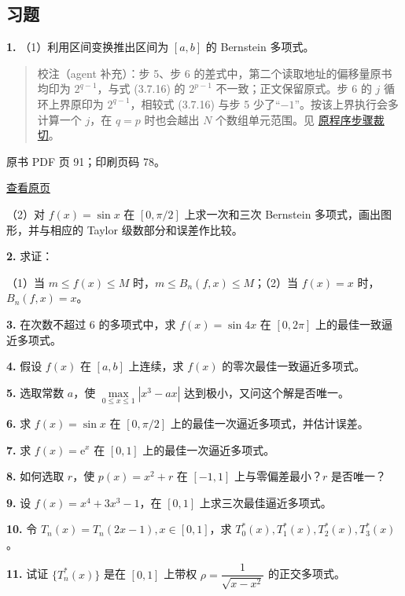 \subsection{习题}\label{ch03b-ux4e60ux9898}

\textbf{1.} （1）利用区间变换推出区间为 \([a,b]\) 的 Bernstein 多项式。

\begin{quote}
校注（agent 补充）：步 5、步 6 的差式中，第二个读取地址的偏移量原书均印为 \(2^{q-1}\)，与式 (3.7.16) 的 \(2^{p-1}\) 不一致；正文保留原式。步 6 的 \(j\) 循环上界原印为 \(2^{q-1}\)，相较式 (3.7.16) 与步 5 少了``\(-1\)''。按该上界执行会多计算一个 \(j\)，在 \(q=p\) 时也会越出 \(N\) 个数组单元范围。见 \href{verified/assets/ch03b/p090-fft-steps.png}{原程序步骤裁切}。
\end{quote}

\clearpage

原书 PDF 页 91；印刷页码 78。

\href{source-images/pdf-091.jpeg}{查看原页}

（2）对 \(f(x)=\sin x\) 在 \([0,\pi/2]\) 上求一次和三次 Bernstein 多项式，画出图形，并与相应的 Taylor 级数部分和误差作比较。

\textbf{2.} 求证：

（1）当 \(m\leqslant f(x)\leqslant M\) 时，\(m\leqslant B_n(f,x)\leqslant M\)；（2）当 \(f(x)=x\) 时，\(B_n(f,x)=x\)。

\textbf{3.} 在次数不超过 \(6\) 的多项式中，求 \(f(x)=\sin4x\) 在 \([0,2\pi]\) 上的最佳一致逼近多项式。

\textbf{4.} 假设 \(f(x)\) 在 \([a,b]\) 上连续，求 \(f(x)\) 的零次最佳一致逼近多项式。

\textbf{5.} 选取常数 \(a\)，使 \(\max\limits_{0\leqslant x\leqslant1}|x^3-ax|\) 达到极小，又问这个解是否唯一。

\textbf{6.} 求 \(f(x)=\sin x\) 在 \([0,\pi/2]\) 上的最佳一次逼近多项式，并估计误差。

\textbf{7.} 求 \(f(x)=\mathrm e^x\) 在 \([0,1]\) 上的最佳一次逼近多项式。

\textbf{8.} 如何选取 \(r\)，使 \(p(x)=x^2+r\) 在 \([-1,1]\) 上与零偏差最小？\(r\) 是否唯一？

\textbf{9.} 设 \(f(x)=x^4+3x^3-1\)，在 \([0,1]\) 上求三次最佳逼近多项式。

\textbf{10.} 令 \(T_n(x)=T_n(2x-1),x\in[0,1]\)，求 \(T_0^*(x),T_1^*(x),T_2^*(x),T_3^*(x)\)。

\textbf{11.} 试证 \(\{T_n^*(x)\}\) 是在 \([0,1]\) 上带权 \(\rho=\dfrac1{\sqrt{x-x^2}}\) 的正交多项式。

